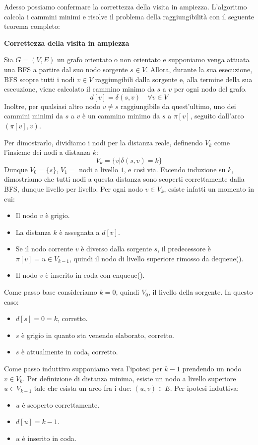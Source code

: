 \noindent Adesso possiamo confermare la correttezza della visita in ampiezza. L'algoritmo calcola i cammini minimi e risolve il problema della raggiungibilità con il seguente teorema completo: \begin{teorema}
	\textbf{Correttezza della visita in ampiezza}\par
	\noindent Sia $G=(V,E)$ un grafo orientato o non orientato e supponiamo venga attuata una BFS a partire dal suo nodo sorgente $s\in V$. Allora, durante la sua esecuzione, BFS scopre tutti i nodi $v\in V$ raggiungibili dalla sorgente e, alla termine della sua esecuzione, viene calcolato il cammino minimo da $s$ a $v$ per ogni nodo del grafo. \[d[v]= \delta(s,v)\quad \forall v\in V\]
	\noindent Inoltre, per qualsiasi altro nodo $v \neq s$ raggiungibile da quest'ultimo, uno dei cammini minimi da $s$ a $v$ è un cammino minimo da $s$ a $\pi[v]$, seguito dall'arco $(\pi[v], v)$.
\end{teorema}
\noindent Per dimostrarlo, dividiamo i nodi per la distanza reale, definendo $V_k$ come l'insieme dei nodi a distanza $k$: \[V_k = \{v | \delta(s,v) = k\}\]
\noindent Dunque $V_0 = \{s\}$, $V_1 = $ nodi a livello $1$, e così via. Facendo induzione su $k$, dimostriamo che tutti nodi a questa distanza sono scoperti correttamente dalla BFS, dunque livello per livello. Per ogni nodo $v\in V_k$, esiste infatti un momento in cui: \begin{itemize}
	\item Il nodo $v$ è grigio.
	\item La distanza $k$ è assegnata a $d[v]$.
	\item Se il nodo corrente $v$ è diverso dalla sorgente $s$, il predecessore è $\pi[v] = u\in V_{k-1}$, quindi il nodo di livello superiore rimosso da dequeue().
	\item Il nodo $v$ è inserito in coda con enqueue().
\end{itemize}
\noindent Come passo base consideriamo $k=0$, quindi $V_0$, il livello della sorgente. In questo caso: \begin{itemize}
	\item $d[s] = 0 = k$, corretto.
	\item $s$ è grigio in quanto sta venendo elaborato, corretto.
	\item $s$ è attualmente in coda, corretto.
\end{itemize}
\noindent Come passo induttivo supponiamo vera l'ipotesi per $k-1$ prendendo un nodo $v\in V_k$. Per definizione di distanza minima, esiste un nodo a livello superiore $u\in V_{k-1}$ tale che esista un arco fra i due: $(u,v)\in E$. Per ipotesi induttiva: \begin{itemize}
	\item $u$ è scoperto correttamente.
	\item $d[u] = k-1$.
	\item $u$ è inserito in coda.
\end{itemize}
